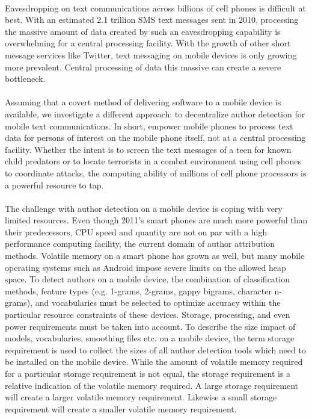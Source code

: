 \paragraph*{} Eavesdropping on text communications across billions of cell phones is difficult at best.  With an estimated 2.1 trillion SMS text messages sent in 2010, processing the massive amount of data created by such an eavesdropping capability is overwhelming for a central processing facility.  With the growth of other short message services like Twitter, text messaging on mobile devices is only growing more prevalent. Central processing of data this massive can create a severe bottleneck.
\paragraph*{} Assuming that a covert method of delivering software to a mobile device is available, we investigate a different approach: to decentralize author detection for mobile text communications. In short, empower mobile phones to process text data for persons of interest on the mobile phone itself, not at a central processing facility.  Whether the intent is to screen the text messages of a teen for known child predators or to locate terrorists in a combat environment using cell phones to coordinate attacks, the computing ability of millions of cell phone processors is a powerful resource to tap.
\paragraph*{} The challenge with author detection on a mobile device is coping with very limited resources.  Even though 2011's smart phones are much more powerful than their predecessors, CPU speed and quantity are not on par with a high performance computing facility, the current domain of author attribution methods.  Volatile memory on a smart phone has grown as well, but many mobile operating systems such as Android impose severe limits on the allowed heap space.  To detect authors on a mobile device, the combination of classification methods, feature types (e.g. 1-grams, 2-grams, gappy bigrams, character n-grams), and vocabularies must be selected to optimize accuracy within the particular resource constraints of these devices. Storage, processing, and even power requirements must be taken into account. To describe the size impact of models, vocabularies, smoothing files etc. on a mobile device, the term storage requirement is used to collect the sizes of all author detection tools which need to be installed on the mobile device.  While the amount of volatile memory required for a particular storage requirement is not equal, the storage requirement is a relative indication of the volatile memory required.  A large storage requirement will create a larger volatile memory requirement.  Likewise a small storage requirement will create a smaller volatile memory requirement.

